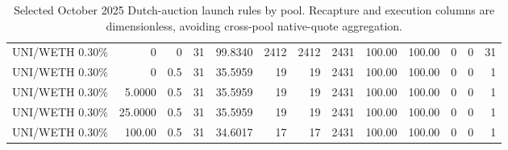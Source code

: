 \begin{table}[t]
{\begin{tabular}{@{}lrrrrrrrrrrrr@{}}
UNI/WETH 0.30\% & 0 & 0 & 31 & 99.8340 & 2412 & 2412 & 2431 & 100.00 & 100.00 & 0 & 0 & 31 \\
UNI/WETH 0.30\% & 0 & 0.5 & 31 & 35.5959 & 19 & 19 & 2431 & 100.00 & 100.00 & 0 & 0 & 1 \\
UNI/WETH 0.30\% & 5.0000 & 0.5 & 31 & 35.5959 & 19 & 19 & 2431 & 100.00 & 100.00 & 0 & 0 & 1 \\
UNI/WETH 0.30\% & 25.0000 & 0.5 & 31 & 35.5959 & 19 & 19 & 2431 & 100.00 & 100.00 & 0 & 0 & 1 \\
UNI/WETH 0.30\% & 100.00 & 0.5 & 31 & 34.6017 & 17 & 17 & 2431 & 100.00 & 100.00 & 0 & 0 & 1 \\
\bottomrule
\end{tabular}}
\caption{Selected October 2025 Dutch-auction launch rules by pool. Recapture and execution columns are dimensionless, avoiding cross-pool native-quote aggregation.}
\label{tab:month-launch-policy-by-pool}
\end{table}
